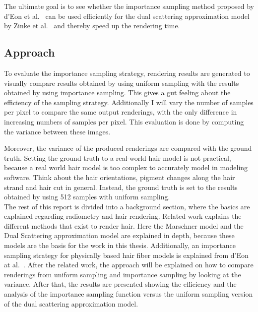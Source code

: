 \documentclass[11pt,a4paper]{report}
\begin{document}
The ultimate goal is to see whether the importance sampling method proposed by d'Eon et al.~\cite{eon2013} can be used efficiently for the dual scattering approximation model by Zinke et al.~\cite{zinke} and thereby speed up the rendering time.

\subsection*{Approach}

To evaluate the importance sampling strategy, rendering results are generated to visually compare results obtained by using uniform sampling with the results obtained by using importance sampling. This gives a gut feeling about the efficiency of the sampling strategy. Additionally I will vary the number of samples per pixel to compare the same output renderings, with the only difference in increasing numbers of samples per pixel. This evaluation is done by computing the variance between these images.

Moreover, the variance of the produced renderings are compared with the ground truth. Setting the ground truth to a real-world hair model is not practical, because a real world hair model is too complex to accurately model in modeling software. Think about the hair orientations, pigment changes along the hair strand and hair cut in general. Instead, the ground truth is set to the results obtained by using 512 samples with uniform sampling.\\

The rest of this report is divided into a background section, where the basics are explained regarding radiometry and hair rendering. Related work explains the different methods that exist to render hair. Here the Marschner model and the Dual Scattering approximation model are explained in depth, because these models are the basis for the work in this thesis. Additionally, an importance sampling strategy for physically based hair fiber models is explained from d'Eon at al.~\cite{eon2013}. After the related work, the approach will be explained on how to compare renderings from uniform sampling and importance sampling by looking at the variance. After that, the results are presented showing the efficiency and the analysis of the importance sampling function versus the uniform sampling version of the dual scattering approximation model.

%
%
\end{document}
